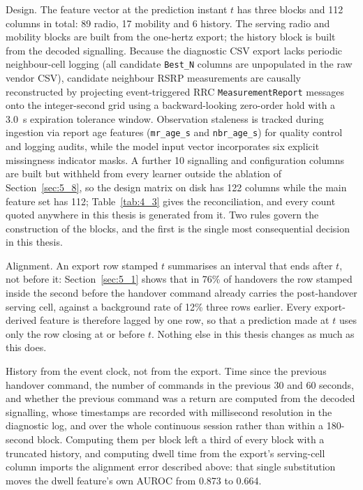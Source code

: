 Design. The feature vector at the prediction instant $t$ has three blocks and 112 columns in total: 89 radio, 17 mobility and 6 history. The serving radio and mobility blocks are built from the one-hertz export; the history block is built from the decoded signalling. Because the diagnostic CSV export lacks periodic neighbour-cell logging (all candidate \texttt{Best\_N} columns are unpopulated in the raw vendor CSV), candidate neighbour RSRP measurements are causally reconstructed by projecting event-triggered RRC \texttt{MeasurementReport} messages onto the integer-second grid using a backward-looking zero-order hold with a 3.0~s expiration tolerance window. Observation staleness is tracked during ingestion via report age features (\texttt{mr\_age\_s} and \texttt{nbr\_age\_s}) for quality control and logging audits, while the model input vector incorporates six explicit missingness indicator masks. A further 10 signalling and configuration columns are built but withheld from every learner outside the ablation of Section~\ref{sec:5_8}, so the design matrix on disk has 122 columns while the main feature set has 112; Table~\ref{tab:4_3} gives the reconciliation, and every count quoted anywhere in this thesis is generated from it. Two rules govern the construction of the blocks, and the first is the single most consequential decision in this thesis.

Alignment. An export row stamped $t$ summarises an interval that ends after $t$, not before it: Section~\ref{sec:5_1} shows that in 76\% of handovers the row stamped inside the second before the handover command already carries the post-handover serving cell, against a background rate of 12\% three rows earlier. Every export-derived feature is therefore lagged by one row, so that a prediction made at $t$ uses only the row closing at or before $t$. Nothing else in this thesis changes as much as this does.

History from the event clock, not from the export. Time since the previous handover command, the number of commands in the previous 30 and 60 seconds, and whether the previous command was a return are computed from the decoded signalling, whose timestamps are recorded with millisecond resolution in the diagnostic log, and over the whole continuous session rather than within a 180-second block. Computing them per block left a third of every block with a truncated history, and computing dwell time from the export's serving-cell column imports the alignment error described above: that single substitution moves the dwell feature's own AUROC from 0.873 to 0.664.

